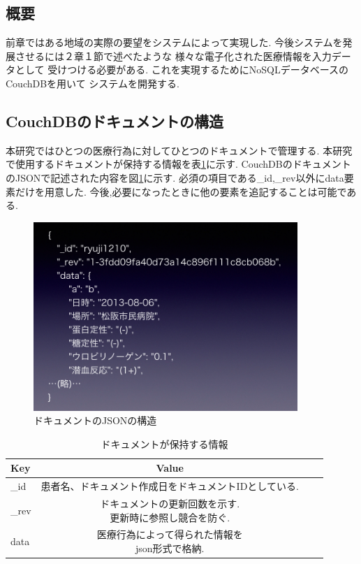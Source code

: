 \subsection{概要}
	前章ではある地域の実際の要望をシステムによって実現した.
	今後システムを発展させるには２章１節で述べたような
	様々な電子化された医療情報を入力データとして
	受けつける必要がある.
	これを実現するためにNoSQLデータベースのCouchDBを用いて
	システムを開発する.



\subsection{CouchDBのドキュメントの構造}
	本研究ではひとつの医療行為に対してひとつのドキュメントで管理する.
  本研究で使用するドキュメントが保持する情報を表\ref{tab:doc}に示す.
  CouchDBのドキュメントのJSONで記述された内容を図\ref{json-for-doc}に示す.
  必須の項目である\_id,\_rev以外にdata要素だけを用意した.
  今後,必要になったときに他の要素を追記することは可能である.


  \begin{figure}[htbp]
    \begin{center}
      \includegraphics[width=10cm, bb=0 0 1027 737]{./gazou/json-for-doc2.png}
    \end{center}
    \caption{ドキュメントのJSONの構造}
    \label{json-for-doc}
  \end{figure}


  \begin{table}[htb]
    \begin{center}
      \caption{ドキュメントが保持する情報}
      \begin{tabular}{|l|c|r|r|}\hline
      Key & Value \\ \hline \hline
      \_id &  患者名、ドキュメント作成日をドキュメントIDとしている. \\ \hline
      \_rev & \shortstack{ドキュメントの更新回数を示す. \\ 更新時に参照し競合を防ぐ.} \\ \hline
      data & \shortstack{医療行為によって得られた情報を \\ json形式で格納.} \\ \hline
      \end{tabular}
      \label{tab:doc}
    \end{center}
  \end{table}


